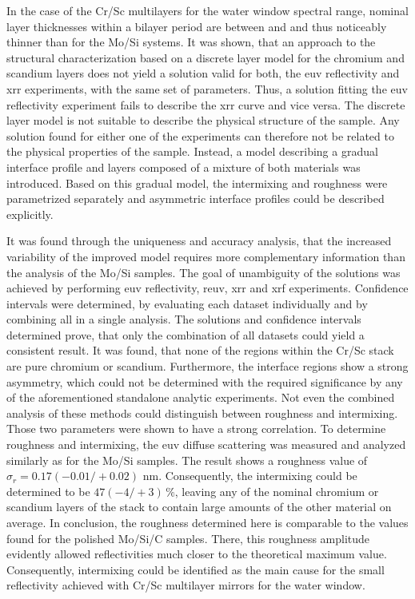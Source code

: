 In the case of the Cr/Sc multilayers for the water window spectral range, nominal layer thicknesses within a bilayer period are between  and  and thus noticeably thinner than for the Mo/Si systems. It was shown, that an approach to the structural characterization based on a discrete layer model for the chromium and scandium layers does not yield a solution valid for both, the \gls{euv} reflectivity and \gls{xrr} experiments, with the same set of parameters. Thus, a solution fitting the \gls{euv} reflectivity experiment fails to describe the \gls{xrr} curve and vice versa. The discrete layer model is not suitable to describe the physical structure of the sample. Any solution found for either one of the experiments can therefore not be related to the physical properties of the sample. Instead, a model describing a gradual interface profile and layers composed of a mixture of both materials was introduced. Based on this gradual model, the intermixing and roughness were parametrized separately and asymmetric interface profiles could be described explicitly.

It was found through the uniqueness and accuracy analysis, that the increased variability of the improved model requires more complementary information than the analysis of the Mo/Si samples. The goal of unambiguity of the solutions was achieved by performing \gls{euv} reflectivity, \gls{reuv}, \gls{xrr} and \gls{xrf} experiments. Confidence intervals were determined, by evaluating each dataset individually and by combining all in a single analysis. The solutions and confidence intervals determined prove, that only the combination of all datasets could yield a consistent result. It was found, that none of the regions within the Cr/Sc stack are pure chromium or scandium. Furthermore, the interface regions show a strong asymmetry, which could not be determined with the required significance by any of the aforementioned standalone analytic experiments. Not even the combined analysis of these methods could distinguish between roughness and intermixing. Those two parameters were shown to have a strong correlation. To determine roughness and intermixing, the \gls{euv} diffuse scattering was measured and analyzed similarly as for the Mo/Si samples. The result shows a roughness value of $\sigma_r = 0.17  (-0.01/+0.02)$ nm. Consequently, the intermixing could be determined to be $47 (-4/+3)\, \%$, leaving any of the nominal chromium or scandium layers of the stack to contain large amounts of the other material on average. In conclusion, the roughness determined here is comparable to the values found for the polished Mo/Si/C samples. There, this roughness amplitude evidently allowed reflectivities much closer to the theoretical maximum value. Consequently, intermixing could be identified  as the main cause for the small reflectivity achieved with Cr/Sc multilayer mirrors for the water window.

